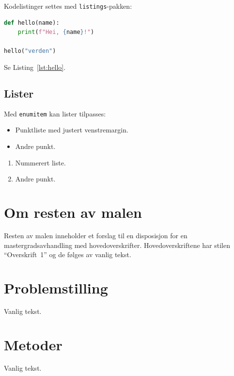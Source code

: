 \documentclass{USN-MSc}
\begin{document}
Kodelistinger settes med \texttt{listings}-pakken:

\begin{lstlisting}[language=Python, caption={Eksempel på Python-kode.}, label={lst:hello}]
def hello(name):
    print(f"Hei, {name}!")

hello("verden")
\end{lstlisting}

Se Listing~\ref{lst:hello}.

\subsection{Lister}

Med \texttt{enumitem} kan lister tilpasses:
\begin{itemize}[leftmargin=*, itemsep=0.2em]
  \item Punktliste med justert venstremargin.
  \item Andre punkt.
\end{itemize}

\begin{enumerate}[label=\arabic*., leftmargin=*]
  \item Nummerert liste.
  \item Andre punkt.
\end{enumerate}

\section{Om resten av malen}

Resten av malen inneholder et forslag til en disposisjon for en
mastergradsavhandling med hovedoverskrifter. Hovedoverskriftene har stilen
``Overskrift~1'' og de følges av vanlig tekst.

\section{Problemstilling}

Vanlig tekst.

\section{Metoder}

Vanlig tekst.

\end{document}
